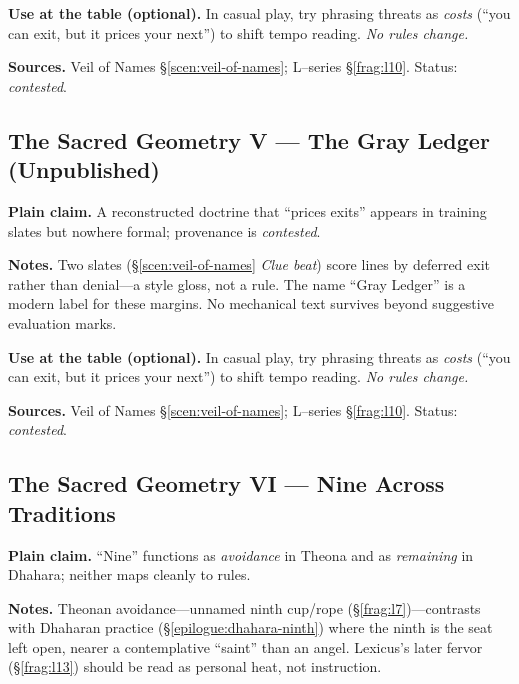\documentclass[11pt]{article}
\begin{document}
\begin{itemize}
\medskip
\noindent\textbf{Use at the table (optional).} In casual play, try phrasing threats as \emph{costs} (“you can exit, but it prices your next”) to shift tempo reading. \emph{No rules change.}

\medskip
\noindent\textbf{Sources.} Veil of Names \S\ref{scen:veil-of-names}; L–series \S\ref{frag:l10}. Status: \emph{contested}.

\subsection{The Sacred Geometry V — The Gray Ledger (Unpublished)}
\label{konmetry:gray-ledger}
{}

\noindent\textbf{Plain claim.} A reconstructed doctrine that “prices exits” appears in training slates but nowhere formal; provenance is \emph{contested}.

\medskip
\noindent\textbf{Notes.} Two slates (\S\ref{scen:veil-of-names} \emph{Clue beat}) score lines by deferred exit rather than denial—a style gloss, not a rule. The name “Gray Ledger” is a modern label for these margins. No mechanical text survives beyond suggestive evaluation marks.

\medskip
\noindent\textbf{Use at the table (optional).} In casual play, try phrasing threats as \emph{costs} (“you can exit, but it prices your next”) to shift tempo reading. \emph{No rules change.}

\medskip
\noindent\textbf{Sources.} Veil of Names \S\ref{scen:veil-of-names}; L–series \S\ref{frag:l10}. Status: \emph{contested}.

\subsection{The Sacred Geometry VI — Nine Across Traditions}
\label{konmetry:nine}
{}

\noindent\textbf{Plain claim.} “Nine” functions as \emph{avoidance} in Theona and as \emph{remaining} in Dhahara; neither maps cleanly to rules.

\medskip
\noindent\textbf{Notes.} Theonan avoidance—unnamed ninth cup/rope (\S\ref{frag:l7})—contrasts with Dhaharan practice (\S\ref{epilogue:dhahara-ninth}) where the ninth is the seat left open, nearer a contemplative “saint” than an angel. Lexicus’s later fervor (\S\ref{frag:l13}) should be read as personal heat, not instruction.


\end{itemize}
\end{document}
